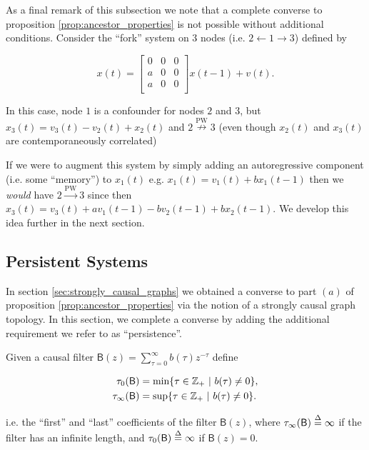 \documentclass[12pt]{article}
\def\pwgc{\overset{\text{PW}}{\rightarrow}}  %
\def\npwgc{\overset{\text{PW}}{\nrightarrow}}  %
\def\B{\mathsf{B}}  %
\begin{document}
\begin{example}
  As a final remark of this subsection we note that a complete
  converse to proposition \ref{prop:ancestor_properties} is not
  possible without additional conditions.  Consider the ``fork'' system on $3$
  nodes (i.e. $2 \leftarrow 1 \rightarrow 3$) defined by

  \begin{equation*}
    x(t) =
    \left[
      \begin{array}{cccc}
        0 & 0 & 0\\
        a & 0 & 0\\
        a & 0 & 0\\
      \end{array}
    \right] x(t - 1) + v(t).
  \end{equation*}

  In this case, node $1$ is a confounder for nodes $2$ and $3$, but
  $x_3(t) = v_3(t) - v_2(t) + x_2(t)$ and $2 \npwgc 3$ (even
  though $x_2(t)$ and $x_3(t)$ are contemporaneously correlated)

  If we were to augment this system by simply adding an autoregressive
  component (i.e. some ``memory'') to $x_1(t)$ e.g.
  $x_1(t) = v_1(t) + b x_1(t - 1)$ then we \textit{would} have
  $2 \pwgc 3$ since then
  $x_3(t) = v_3(t) + av_1(t - 1) - bv_2(t - 1) + bx_2(t - 1)$.  We
  develop this idea further in the next section.
\end{example}

\subsection{Persistent Systems}
\label{sec:persistent_systems}
In section \ref{sec:strongly_causal_graphs} we obtained a converse to
part $(a)$ of proposition \ref{prop:ancestor_properties} via the
notion of a strongly causal graph topology.  In this section, we
complete a converse by adding the additional requirement we refer to
as ``persistence''.

\begin{definition}
  Given a causal filter $\B(z) = \sum_{\tau = 0}^\infty b(\tau)z^{-\tau}$
  define 

  \begin{align}
    \tau_0(\B) &= \text{min}\{\tau \in \Z_+\ |\ b(\tau) \ne 0\},\\
    \tau_{\infty}(\B) &= \text{sup}\{\tau \in \Z_+\ |\ b(\tau) \ne 0\}.\\
  \end{align}

  i.e. the ``first'' and ``last'' coefficients of the filter $\B(z)$,
  where $\tau_\infty(\B) \defeq \infty$ if the filter has an infinite
  length, and $\tau_0(\B) \defeq \infty$ if $\B(z) = 0$.
\end{definition}
\end{document}
